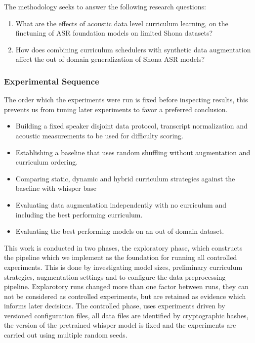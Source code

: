 {The methodology seeks to answer the following research questions:

\begin{enumerate}
    \item What are the effects of acoustic data level curriculum learning, on the finetuning of ASR foundation models on limited Shona datasets?\citep{Braun2017}
    \item How does combining curriculum schedulers with synthetic data augmentation affect the out of domain generalization of Shona ASR models?
\end{enumerate}

\subsubsection{Experimental Sequence}

The order which the experiments were run is fixed before inspecting results, this prevents us from tuning later experiments to favor a preferred conclusion.
\begin{itemize}
    \item Building a fixed speaker disjoint data protocol, transcript normalization and acoustic measurements to be used for difficulty scoring. 
    \item Establishing a baseline that uses random shuffling without augmentation and curriculum ordering.
    \item Comparing static, dynamic and hybrid curriculum strategies against the baseline with whisper base
    \item Evaluating data augmentation independently with no curriculum and including the best performing curriculum.
    \item Evaluating the best performing models on an out of domain dataset.
\end{itemize}

This work is conducted in two phases, the exploratory phase, which constructs the pipeline which we implement as the foundation for running all controlled experiments. This is done by investigating model sizes, preliminary curriculum strategies, augmentation settings and to configure the data preprocessing pipeline. Explarotory runs changed more than one factor between runs, they can not be considered as controlled experiments, but are retained as evidence which informs later decisions. The controlled phase, uses experiments driven by versioned configuration files, all data files are identified by cryptographic hashes, the version of the pretrained whisper model is fixed and the experiments are carried out using multiple random seeds.

}
